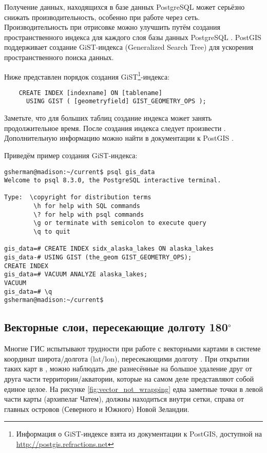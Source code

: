 Получение данных, находящихся в базе данных PostgreSQL может серьёзно снижать производительность,
особенно при работе через сеть. Производительность при отрисовке можно улучшить
путём создания пространственного индекса для каждого слоя базы данных PostgreSQL .
PostGIS поддерживает создание
 GiST-индекса
(Generalized Search Tree) для ускорения пространственного поиска данных.

Ниже представлен порядок создания GiST\footnote{Информация о GiST-индексе взята из документации к PostGIS,
доступной на \url{http://postgis.refractions.net}}-индекса:

\begin{verbatim}
    CREATE INDEX [indexname] ON [tablename]
      USING GIST ( [geometryfield] GIST_GEOMETRY_OPS );
\end{verbatim}

Заметьте, что для больших таблиц создание индекса может занять продолжительное время. После
создания индекса следует произвести . Дополнительную
информацию можно найти в документации к PostGIS \cite{PostGISweb}.

Приведём пример создания GiST-индекса:
\begin{verbatim}
gsherman@madison:~/current$ psql gis_data
Welcome to psql 8.3.0, the PostgreSQL interactive terminal.

Type:  \copyright for distribution terms
        \h for help with SQL commands
        \? for help with psql commands
        \g or terminate with semicolon to execute query
        \q to quit

gis_data=# CREATE INDEX sidx_alaska_lakes ON alaska_lakes
gis_data-# USING GIST (the_geom GIST_GEOMETRY_OPS);
CREATE INDEX
gis_data=# VACUUM ANALYZE alaska_lakes;
VACUUM
gis_data=# \q
gsherman@madison:~/current$
\end{verbatim}

\subsection{Векторные слои, пересекающие долготу 180$^\circ$}

Многие ГИС испытывают трудности при работе с векторными картами в системе координат широта/долгота
(lat/lon), пересекающими долготу . При открытии таких карт
в \qg, можно наблюдать две разнесённые на большое удаление друг от друга части территории/акватории, которые
на самом деле представляют собой единое целое. На рисунке \ref{fig:vector_not_wrapping} едва заметные точки
в левой части карты (архипелаг Чатем), должны находиться внутри сетки,
справа от главных островов (Северного и Южного) Новой Зеландии. %

